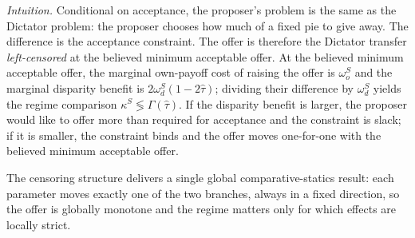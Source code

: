 \documentclass[11pt]{article}
\theoremstyle{plain}
\theoremstyle{remark}
\begin{document}
\noindent\emph{Intuition.}  Conditional on acceptance, the proposer's problem is the same as the Dictator problem: the proposer chooses how much of a fixed pie to give away.  The difference is the acceptance constraint.  The offer is therefore the Dictator transfer \emph{left-censored} at the believed minimum acceptable offer.  At the believed minimum acceptable offer, the marginal own-payoff cost of raising the offer is $\omega_o^S$ and the marginal disparity benefit is $2\omega_d^S(1-2\hat\tau)$; dividing their difference by $\omega_d^S$ yields the regime comparison $\kappa^S\lessgtr\Gamma(\hat\tau)$.  If the disparity benefit is larger, the proposer would like to offer more than required for acceptance and the constraint is slack; if it is smaller, the constraint binds and the offer moves one-for-one with the believed minimum acceptable offer.

The censoring structure delivers a single global comparative-statics result: each parameter moves exactly one of the two branches, always in a fixed direction, so the offer is globally monotone and the regime matters only for which effects are locally strict.
\end{document}
